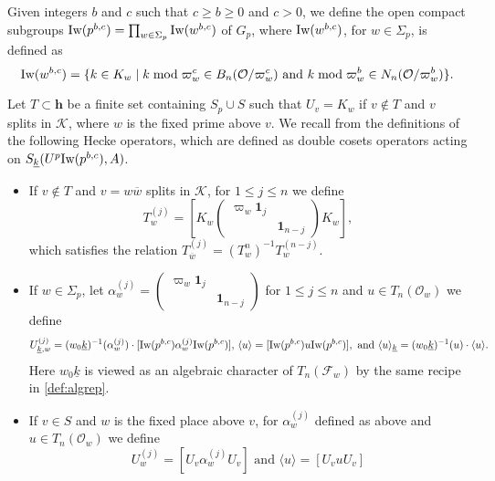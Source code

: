 \documentclass[leqno]{amsart}
\theoremstyle{definition}
\theoremstyle{remark}
\newcommand{\smat}[1]{\left(\begin{smallmatrix} #1 \end{smallmatrix}\right)}
\newcommand{\id}{\mathbf{1}}
\newcommand{\oo}{\mathcal{O}}
\newcommand{\finite}{\mathbf{h}}
\newcommand{\F}{{\mathcal{F}}} %
\newcommand{\K}{{\mathcal{K}}} %
\newcommand{\bw}{{\overline{w}}}
\newcommand{\wt}[1]{\underline{ #1 }}
\newcommand{\Iw}{\textnormal{Iw}} %
\begin{document}
Given integers $b$ and $c$
such that $c\geq b\geq 0$ and $c>0$,
we define the open compact subgroups
$\Iw(p^{b,c})=\prod_{w\in \Sigma_p}\Iw(w^{b,c})$ of $G_p$, where 
$\Iw(w^{b,c})$, for $w\in \Sigma_p$, is defined as
\begin{equation}\label{def:Iwahori}
	\Iw(w^{b,c})=\{
	k\in K_w\mid 
    k \bmod \varpi_w^c \in B_n(\oo/\varpi_w^c)
	\text{ and }
	k \bmod \varpi_w^b \in N_n(\oo/\varpi_w^b)
	\}.
\end{equation}

Let $T\subset\finite$ be a finite set containing $S_p\cup S$
such that $U_v=K_w$ if $v\notin T$ and $v$ splits in $\K$,
where $w$ is the fixed prime above $v$.
We recall from \cite{ger} 
the definitions of the following Hecke operators,
which are defined as double cosets operators
acting on $S_{\wt{k}}(U^p\Iw(p^{b,c}),A)$.
\begin{itemize}

\item 
If $v\notin T$ and $v=w\bw$ splits in $\K$,
for $1\leq j\leq n$ we define 
\begin{equation}\label{def:hecke_away_p}
	T_w^{(j)}=
	\left[
	K_w
	\begin{pmatrix}
		\varpi_w\id_{j}&\\&\id_{n-j}
	\end{pmatrix}
	K_w
	\right],
\end{equation}
which satisfies the relation
$T_{\bw}^{(j)}=(T_{w}^{{n}})^{-1}T_w^{(n-j)}$.

\item
If $w\in \Sigma_p$, let  
$\alpha_w^{(j)}=
\smat{ \varpi_w\id_{j}&\\&\id_{n-j} } $
for $1\leq j\leq n$
and $u\in T_n(\oo_w)$ we define
\begin{equation}\label{def:hecke_at_p}
	U_{\wt{k},w}^{(j)}=
	(w_0\wt{k})^{-1}(\alpha_{w}^{(j)})\cdot
	[\Iw(p^{b,c})\alpha_w^{(j)}\Iw(p^{b,c})],\,
	\langle u\rangle=
	[\Iw(p^{b,c})u\Iw(p^{b,c})],
	\text{ and }
	\langle u\rangle_{\wt{k}}= (w_0\wt{k})^{-1}(u)\cdot \langle u\rangle.
\end{equation}
Here $w_0\wt{k}$ is viewed as an algebraic character of $T_n(\F_w)$ 
by the same recipe in \eqref{def:algrep}.

\item 
If $v\in S$ and $w$ is the fixed place above $v$,
for $\alpha_w^{(j)}$ defined as above
and $u\in T_n(\oo_w)$ we define 
\begin{equation}\label{def:hecke_at_s}
	U_{w}^{(j)}=
	[U_v\alpha_w^{(j)}U_v]
	\text{ and }
	\langle u\rangle= 
	[U_vu U_v]
\end{equation}

\end{itemize}
\end{document}
